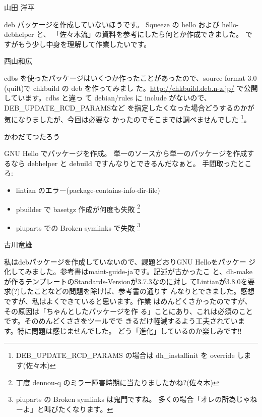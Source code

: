 \documentclass[mingoth,a4paper]{jsarticle}
\begin{document}
\begin{prework}{ 山田 洋平 }

    deb パッケージを作成していないほうです。
    Squeeze の hello および hello-debhelper と、
    「佐々木流」の資料を参考にしたら何とか作成できました。
    ですがもう少し中身を理解して作業したいです。
    
\end{prework}



\begin{prework}{ 西山和広 }

    cdbs を使ったパッケージはいくつか作ったことがあったので、source
    format 3.0 (quilt)で chkbuild の deb を作ってみまし
    た。\url{http://chkbuild.deb.n-z.jp/} で公開しています。cdbs と違っ
    て debian/rules に include がないので、DEB\_UPDATE\_RCD\_PARAMSなど
    を指定したくなった場合どうするのかが気になりましたが、今回は必要な
    かったのでそこまでは調べませんでした
    \footnote{%
      DEB\_UPDATE\_RCD\_PARAMS の場合は dh\_installinit を override
      します(佐々木)}。

\end{prework}



\begin{prework}{ かわだてつたろう }

GNU Hello でパッケージを作成。
単一のソースから単一のパッケージを作成するなら debhelper と debuild ですんなりとできるんだなぁと。
手間取ったところ:
\begin{itemize}
      \item lintian のエラー(package-contains-info-dir-file)
      \item pbuilder で basetgz 作成が何度も失敗
    \footnote{丁度 dennou-q のミラー障害時期に当たりましたかね?(佐々木)}
      \item piuparts での Broken symlinks で失敗
    \footnote{piuparts の Broken symlinks は鬼門ですね。
      多くの場合「オレの所為じゃねーよ」と叫びたくなります。}
\end{itemize}

\end{prework}



\begin{prework}{ 古川竜雄 }

    私はdebパッケージを作成していないので、課題どおりGNU Helloをパッケー
    ジ化してみました。参考書はmaint-guide-jaです。記述が古かったこ
    と、dh-makeが作るテンプレートのStandards-Versionが3.7.3なのに対し
    てLintianが3.8.0を要求(?)したことなどの問題を除けば、参考書の通りす
    んなりとできました。感想ですが、私はよくできていると思います。作業
    はめんどくさかったのですが、その原因は「ちゃんとしたパッケージを作
    る」ことにあり、これは必須のことです。そのめんどくささをツールでで
    きるだけ軽減するよう工夫されています。特に問題は感じませんでした。
    どう「進化」しているのか楽しみです!!

\end{prework}
\end{document}
